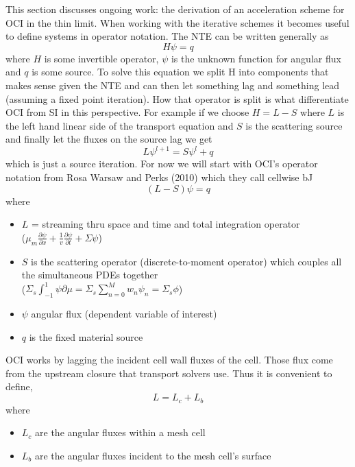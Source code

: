 This section discusses ongoing work: the derivation of an acceleration scheme for OCI in the thin limit.
When working with the iterative schemes it becomes useful to define systems in operator notation.
The NTE can be written generally as
\begin{equation}
    H\psi = q
\end{equation}
where $H$ is some invertible operator, $\psi$ is the unknown function for angular flux and $q$ is some source.
To solve this equation we split H into components that makes sense given the NTE and can then let something lag and something lead (assuming a fixed point iteration).
How that operator is split is what differentiate OCI from SI in this perspective.
For example if we choose $H = L-S$ where $L$ is the left hand linear side of the transport equation and $S$ is the scattering source and finally let the fluxes on the source lag we get
\begin{equation}
    L\psi^{l+1} = S\psi^l + q
\end{equation}
which is just a source iteration.
For now we will start with OCI's operator notation from Rosa Warsaw and Perks (2010) which they call cellwise bJ
\begin{equation}
    \label{eq:operator_nte}
    (L-S)\psi = q
\end{equation}
where
\begin{itemize}
    \item $L$ = streaming thru space and time and total integration operator\\ ($\mu_m\frac{\partial\psi}{\partial x} + \frac{1}{v}\frac{\partial\psi}{\partial t} + \Sigma \psi$)
    \item $S$ is the scattering operator (discrete-to-moment operator) which couples all the simultaneous PDEs together \\($\Sigma_s \int^1_{-1}\psi\partial\mu = \Sigma_s \sum_{n=0}^{M}w_n\psi_n = \Sigma_s\phi$)
    \item $\psi$ angular flux (dependent variable of interest)
    \item $q$ is the fixed material source
\end{itemize}
OCI works by lagging the incident cell wall fluxes of the cell.
Those flux come from the upstream closure that transport solvers use.
Thus it is convenient to define,
\begin{equation}
    L = L_c + L_b
\end{equation}
where
\begin{itemize}
    \item $L_c$ are the angular fluxes within a mesh cell
    \item $L_b$ are the angular fluxes incident to the mesh cell's surface
\end{itemize}
